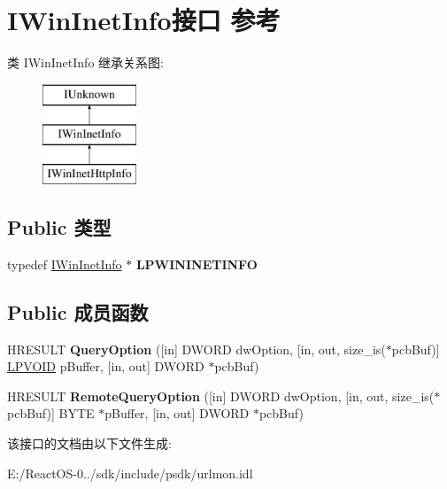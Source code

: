 \hypertarget{interface_i_win_inet_info}{}\section{I\+Win\+Inet\+Info接口 参考}
\label{interface_i_win_inet_info}
类 I\+Win\+Inet\+Info 继承关系图\+:\begin{figure}[H]
\begin{center}
\leavevmode
\includegraphics[height=3.000000cm]{interface_i_win_inet_info}
\end{center}
\end{figure}
\subsection*{Public 类型}
\begin{DoxyCompactItemize}
\item 
\mbox{\label{interface_i_win_inet_info_adbbdfbf47f9ab8dec836f1581241b843}} 
typedef \hyperlink{interface_i_win_inet_info}{I\+Win\+Inet\+Info} $\ast$ {\bfseries L\+P\+W\+I\+N\+I\+N\+E\+T\+I\+N\+FO}
\end{DoxyCompactItemize}
\subsection*{Public 成员函数}
\begin{DoxyCompactItemize}
\item 
\mbox{\label{interface_i_win_inet_info_aafb3fbc265a145770a1e65bd48eacb6e}} 
H\+R\+E\+S\+U\+LT {\bfseries Query\+Option} (\mbox{[}in\mbox{]} D\+W\+O\+RD dw\+Option, \mbox{[}in, out, size\+\_\+is($\ast$pcb\+Buf)\mbox{]} \hyperlink{interfacevoid}{L\+P\+V\+O\+ID} p\+Buffer, \mbox{[}in, out\mbox{]} D\+W\+O\+RD $\ast$pcb\+Buf)
\item 
\mbox{\label{interface_i_win_inet_info_a7d2e79e09387089eadda63d0fc604e0a}} 
H\+R\+E\+S\+U\+LT {\bfseries Remote\+Query\+Option} (\mbox{[}in\mbox{]} D\+W\+O\+RD dw\+Option, \mbox{[}in, out, size\+\_\+is($\ast$pcb\+Buf)\mbox{]} B\+Y\+TE $\ast$p\+Buffer, \mbox{[}in, out\mbox{]} D\+W\+O\+RD $\ast$pcb\+Buf)
\end{DoxyCompactItemize}


该接口的文档由以下文件生成\+:\begin{DoxyCompactItemize}
\item 
E\+:/\+React\+O\+S-\/0../sdk/include/psdk/urlmon.\+idl\end{DoxyCompactItemize}
